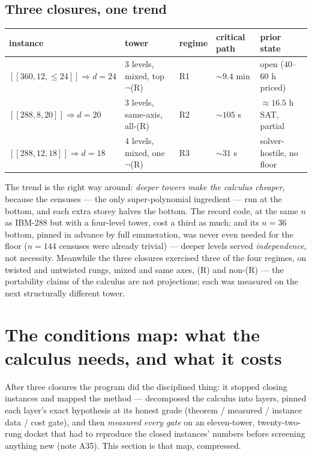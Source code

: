 \documentclass[11pt]{article}
\theoremstyle{plain}
\theoremstyle{definition}
\theoremstyle{remark}
\begin{document}
\subsection{Three closures, one trend}

\begin{center}
\footnotesize
\begin{tabular}{lllll}
\toprule
instance & tower & regime & critical path & prior state\\
\midrule
$[[360,12,\leq24]] \Rightarrow d{=}24$ & 3 levels, mixed, top $\neg$(R)
& R1 & ${\sim}9.4$ min & open ($40$--$60$ h priced)\\
$[[288,8,20]] \Rightarrow d{=}20$ & 3 levels, same-axis, all-(R) & R2 &
${\sim}105$ s & ${\approx}16.5$ h SAT, partial\\
$[[288,12,18]] \Rightarrow d{=}18$ & 4 levels, mixed, one $\neg$(R) & R3
& ${\sim}31$ s & solver-hostile, no floor\\
\bottomrule
\end{tabular}
\end{center}

The trend is the right way around: \emph{deeper towers make the calculus
cheaper}, because the censuses --- the only super-polynomial ingredient
--- run at the bottom, and each extra storey halves the bottom. The
record code, at the same $n$ as IBM-288 but with a four-level tower, cost
a third as much; and its $n = 36$ bottom, pinned in advance by full
enumeration, was never even needed for the floor ($n = 144$ censuses
were already trivial) --- deeper levels served \emph{independence}, not
necessity. Meanwhile the three closures exercised three of the four
regimes, on twisted and untwisted rungs, mixed and same axes, (R) and
non-(R) --- the portability claims of the calculus are not projections;
each was measured on the next structurally different tower.

\section{The conditions map: what the calculus needs, and what it costs}
\label{sec:conditions}

After three closures the program did the disciplined thing: it stopped
closing instances and mapped the method --- decomposed the calculus into
layers, pinned each layer's exact hypothesis at its honest grade
(theorem / measured / instance data / cost gate), and then \emph{measured
every gate} on an eleven-tower, twenty-two-rung docket that had to
reproduce the closed instances' numbers before screening anything new
(note A35). This section is that map, compressed.
\end{document}
